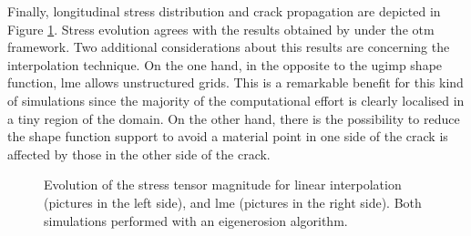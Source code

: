 \message{ !name(2020_EFM_MPM_Eigensoftening.tex)}\documentclass[preprint,12pt,a4paper]{elsarticle}
\begin{document}
Finally, longitudinal stress distribution and crack propagation are
depicted in Figure \ref{fig:Stress-vs-damage-impact-test}. Stress
evolution agrees with the results obtained by \cite{Navas_2017_ES}
under the \acrshort{otm} framework. Two additional considerations about
this results are concerning the interpolation technique. On the one hand,
in the opposite to the \acrshort{ugimp} shape function, \acrshort{lme}
allows unstructured grids. This is a remarkable benefit for this kind
of simulations since the majority of the computational effort is
clearly localised in a tiny region of the domain. On the other
hand, there is the possibility to reduce the shape function support to avoid
a material point in one side of the crack is affected by those in the
other side of the crack. 
\begin{figure}
\centering
{}
\caption{Evolution of the stress tensor magnitude for linear
  interpolation (pictures in the left side), and \acrshort{lme}
  (pictures in the right side). Both simulations performed with an
  eigenerosion algorithm.}
\label{fig:Stress-vs-damage-impact-test}
\end{figure}
\end{document}
